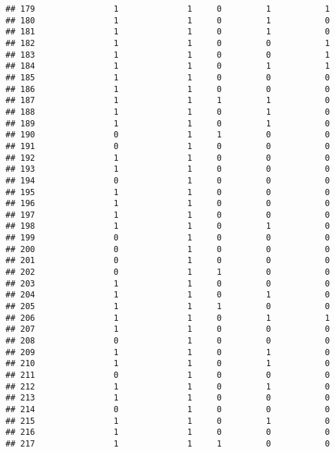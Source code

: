 \documentclass[]{article}
\begin{document}
\begin{verbatim}
## 179                1              1     0         1           1
## 180                1              1     0         1           0
## 181                1              1     0         1           0
## 182                1              1     0         0           1
## 183                1              1     0         0           1
## 184                1              1     0         1           1
## 185                1              1     0         0           0
## 186                1              1     0         0           0
## 187                1              1     1         1           0
## 188                1              1     0         1           0
## 189                1              1     0         1           0
## 190                0              1     1         0           0
## 191                0              1     0         0           0
## 192                1              1     0         0           0
## 193                1              1     0         0           0
## 194                0              1     0         0           0
## 195                1              1     0         0           0
## 196                1              1     0         0           0
## 197                1              1     0         0           0
## 198                1              1     0         1           0
## 199                0              1     0         0           0
## 200                0              1     0         0           0
## 201                0              1     0         0           0
## 202                0              1     1         0           0
## 203                1              1     0         0           0
## 204                1              1     0         1           0
## 205                1              1     1         0           0
## 206                1              1     0         1           1
## 207                1              1     0         0           0
## 208                0              1     0         0           0
## 209                1              1     0         1           0
## 210                1              1     0         1           0
## 211                0              1     0         0           0
## 212                1              1     0         1           0
## 213                1              1     0         0           0
## 214                0              1     0         0           0
## 215                1              1     0         1           0
## 216                1              1     0         0           0
## 217                1              1     1         0           0

\end{verbatim}
\end{document}
